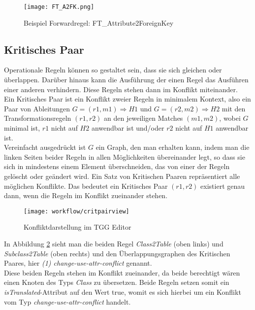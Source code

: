 \begin{figure}[h!]%
	\centering
	\texttt{[image: FT\_A2FK.png]}
	\caption{Beispiel Forwardregel: FT\_Attribute2ForeignKey}
	\label{fig:FT-Attribute2ForeignKey}
\end{figure}

\subsection{Kritisches Paar}

Operationale Regeln können so gestaltet sein, dass sie sich gleichen oder überlappen. Darüber hinaus kann die Ausführung der einen Regel das Ausführen einer anderen verhindern. Diese Regeln stehen dann im Konflikt miteinander.\\
Ein Kritisches Paar ist ein Konflikt zweier Regeln in minimalem Kontext, also ein Paar von Ableitungen $G=(r1,m1) \Rightarrow H1$ und $G=(r2,m2) \Rightarrow H2$ mit den Transformationsregeln $(r1,r2)$ an den jeweiligen Matches $(m1,m2)$, wobei $G$ minimal ist, $r1$ nicht auf $H2$ anwendbar ist und/oder $r2$ nicht auf $H1$ anwendbar ist.\\
Vereinfacht ausgedrückt ist $G$ ein Graph, den man erhalten kann, indem man die linken Seiten beider Regeln in allen Möglichkeiten übereinander legt, so dass sie sich in mindestens einem Element überschneiden, das von einer der Regeln gelöscht oder geändert wird. Ein Satz von Kritischen Paaren repräsentiert alle möglichen Konflikte. Das bedeutet ein Kritisches Paar $(r1, r2)$ existiert genau dann, wenn die Regeln im Konflikt  zueinander stehen.

\begin{figure}[h!]
	\centering
	\texttt{[image: workflow/critpairview]}
	\caption{Konfliktdarstellung im TGG Editor}
	\label{fig:conflict_in_tgg}
\end{figure}

In Abbildung \ref{fig:conflict_in_tgg} sieht man die beiden Regel \textit{Class2Table} (oben links) und \textit{Subclass2Table} (oben rechts) und den Überlappungsgraphen des Kritischen Paares, hier \textit{(1) change-use-attr-conflict} genannt.\\
Diese beiden Regeln stehen im Konflikt zueinander, da beide berechtigt wären einen Knoten des Typs \textit{Class} zu übersetzen. Beide Regeln setzen somit ein \textit{isTranslated}-Attribut auf den Wert true, womit es sich hierbei um ein Konflikt vom Typ \textit{change-use-attr-conflict} handelt.

